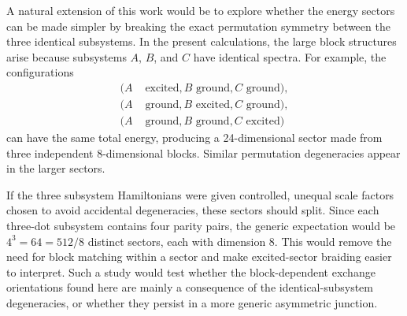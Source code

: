 A natural extension of this work would be to explore whether the energy sectors can be made simpler by breaking the exact permutation symmetry between the three identical subsystems. In the present calculations, the large block structures arise because subsystems \(A\), \(B\), and \(C\) have identical spectra. For example, the configurations
\begin{equation}
\begin{aligned}
  (A& \text{ excited}, B \text{ ground}, C \text{ ground}),\\
  (A& \text{ ground}, B \text{ excited}, C \text{ ground}),\\
  (A& \text{ ground}, B \text{ ground}, C \text{ excited})
\end{aligned}
\end{equation}
can have the same total energy, producing a 24-dimensional sector made from three independent 8-dimensional blocks. Similar permutation degeneracies appear in the larger sectors.

If the three subsystem Hamiltonians were given controlled, unequal scale factors chosen to avoid accidental degeneracies, these sectors should split. Since each three-dot subsystem contains four parity pairs, the generic expectation would be \(4^3=64=512/8\) distinct sectors, each with dimension 8. This would remove the need for block matching within a sector and make excited-sector braiding easier to interpret. Such a study would test whether the block-dependent exchange orientations found here are mainly a consequence of the identical-subsystem degeneracies, or whether they persist in a more generic asymmetric junction.
